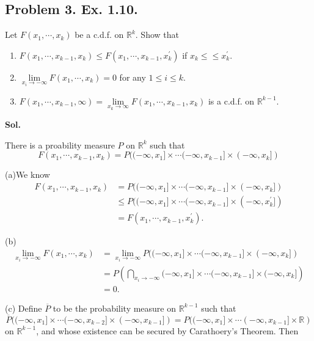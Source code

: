 \documentclass[lang=en,11pt,a4paper,citestyle =authoryear]{elegantpaper}
\newcommand{\R}{\mathbb{R}}
\begin{document}

\subsection*{Problem 3. Ex. 1.10. } 
Let $F(x_1, \cdots, x_k)$ be a c.d.f. on $\R^k$. Show that
\begin{enumerate}
    \item[(a)] $F(x_1, \cdots, x_{k-1}, x_k) \leq F(x_1, \cdots, x_{k-1}, x_k^\prime)$ if $x_k ≤\leq x_k^\prime$.\par
    \item [(b)] $\lim\limits_{ x_i\to -\infty} F(x_1, \cdots, x_k) = 0$ for any $1 \leq i \leq k$.
    \item [(c)] $F(x_1, \cdots, x_{k-1},\infty) = \lim\limits_{x_k\to\infty}F(x_1,\cdots, x_{k-1}, x_k)$ is a c.d.f. on $\R^{k−1}$.
\end{enumerate}
\par
\vspace{0.5em}
\textbf{Sol.} \par
There is a proability measure $P$ on $\R^k$ such that
\[F(x_1,\cdots,x_{k-1},x_k) = P((-\infty,x_1]\times \cdots (-\infty,x_{k-1}] \times (-\infty,x_k])\]\par
(a)We know
\[\begin{aligned}
    F(x_1,\cdots,x_{k-1},x_k) &= P((-\infty,x_1]\times \cdots (-\infty,x_{k-1}] \times (-\infty,x_k]) \\
    &\leq P((-\infty,x_1]\times \cdots (-\infty,x_{k-1}] \times (-\infty,x_k^\prime]) \\
    &= F(x_1,\cdots,x_{k-1},x_k^\prime).
\end{aligned}
\]\par
(b)
\[
\begin{aligned}
    \lim\limits_{ x_i\to -\infty} F(x_1, \cdots, x_k) &= \lim_{x_i\to -\infty}P((-\infty,x_1]\times \cdots (-\infty,x_{k-1}] \times (-\infty,x_k]) \\
    &= P\left(\bigcap_{x_i\to-\infty}(-\infty,x_1]\times \cdots (-\infty,x_{k-1}] \times (-\infty,x_k]\right) \\
    & = 0.
\end{aligned}
\]\par
(c) Define $\overline{P}$ to be the probability measure on $\R^{k-1}$ such that
\[\overline{P}((-\infty,x_1]\times \cdots (-\infty,x_{k-2}] \times (-\infty,x_{k-1}]) = P((-\infty,x_1]\times \cdots (-\infty,x_{k-1}] \times \R)\]
on $\R^{k-1}$, and whose existence can be secured by Carathoery's Theorem. Then
\end{document}
